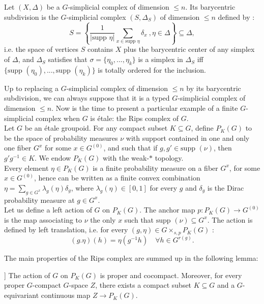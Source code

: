 \begin{definition}
Let $(X,\Delta)$ be a $G$-simplicial complex of dimension $\leq n$. Its barycentric subdivision is the $G$-simplicial complex $(S,\Delta_S)$ of dimension $\leq n$ defined by :
\[S = \left\{ \frac{1}{|\text{supp } \eta|}\sum_{x\in \text{supp } \eta} \delta_x\ ,\eta\in \Delta \right\} \subseteq \Delta ,\]
i.e. the space of vertices $S$ contains $X$ plus the barycentric center of any simplex of $\Delta$, and $\Delta_S $ satisfies that $\sigma = \{ \eta_0, ...,\eta_k\}$ is a simplex in $\Delta_S$ iff $\{\text{supp }(\eta_0),...,\text{supp }(\eta_k) \}$ is totally ordered for the inclusion. %
\end{definition}

Up to replacing a $G$-simplicial complex of dimension $\leq n$ by its barycentric subdivision, we can always suppose that it is a typed $G$-simplicial complex of dimension $\leq n$. Now is the time to present a particular example of a finite $G$-simplicial complex when $G$ is \'etale: the Rips complex of $G$.\\

Let $G$ be an \'etale groupoid. For any compact subset $K\subseteq G$, define $P_K(G)$ to be the space of probability measures $\nu $ with support contained in one and only one fiber $G^x$ for some $x\in G^{(0)}$, and such that if $g,g'\in \text{supp }(\nu)$, then $g'g^{-1}\in K$. We endow $P_K(G)$ with the weak-$*$ topology.\\

Every element $\eta\in P_K(G)$ is a finite probability measure on a fiber $G^x$, for some $x\in G^{(0)}$, hence can be written as a finite convex combination $\eta = \sum_{g\in G^{x}}\lambda_g(\eta)\delta_g$, where $\lambda_g(\eta)\in [0,1]$ for every $g$ and $\delta_g$ is the Dirac probability measure at $g\in G^x$.\\ 

Let us define a left action of $G$ on $P_K(G)$. The anchor map $p : P_K(G)\rightarrow G^{(0)}$ is the map associating to $\nu$ the only $x$ such that $\text{supp }(\nu) \subseteq G^x$. The action is defined by left translation, i.e. for every $(g,\eta)\in G\times_{s,p}P_K(G)$ : 
\[(g.\eta)(h) = \eta(g^{-1}h)\quad \forall h\in G^{r(g)}.\]

The main properties of the Rips complex are summed up in the following lemma: 

\begin{lem}\label{Gspace}]
The action of $G$ on $P_K(G)$ is proper and cocompact. Moreover, for every proper $G$-compact $G$-space $Z$, there exists a compact subset $K\subseteq G$ and a $G$-equivariant continuous map $Z\rightarrow P_K(G)$.
\end{lem}  

